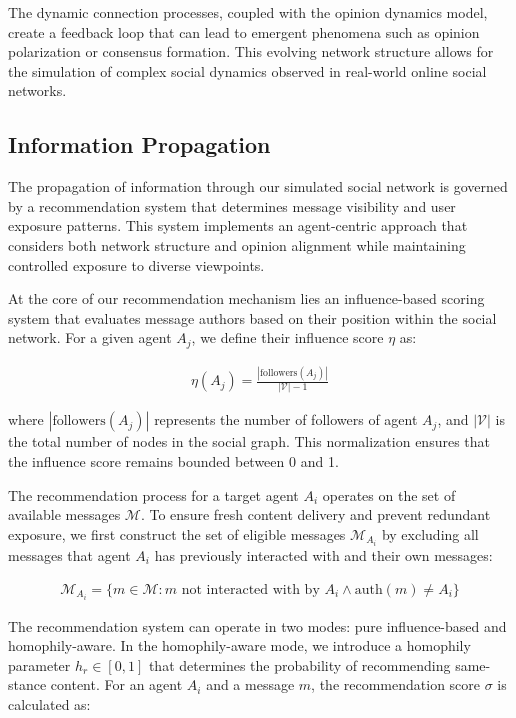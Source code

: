 The dynamic connection processes, coupled with the opinion dynamics model, create a feedback loop that can lead to emergent phenomena such as opinion polarization or consensus formation. This evolving network structure allows for the simulation of complex social dynamics observed in real-world online social networks.

\subsection{Information Propagation}
\label{subsec:information-propagation}

The propagation of information through our simulated social network is governed by a recommendation system that determines message visibility and user exposure patterns. This system implements an agent-centric approach that considers both network structure and opinion alignment while maintaining controlled exposure to diverse viewpoints.

At the core of our recommendation mechanism lies an influence-based scoring system that evaluates message authors based on their position within the social network. For a given agent $A_j$, we define their influence score $\eta$ as:

\begin{align}
\eta(A_j) = \frac{|\text{followers}(A_j)|}{|\mathcal{V}| - 1}
\end{align}

where $|\text{followers}(A_j)|$ represents the number of followers of agent $A_j$, and $|\mathcal{V}|$ is the total number of nodes in the social graph. This normalization ensures that the influence score remains bounded between 0 and 1.

The recommendation process for a target agent $A_i$ operates on the set of available messages $\mathcal{M}$. To ensure fresh content delivery and prevent redundant exposure, we first construct the set of eligible messages $\mathcal{M}_{A_i}$ by excluding all messages that agent $A_i$ has previously interacted with and their own messages:

\begin{align}
\mathcal{M}_{A_i} = \{m \in \mathcal{M} : m \text{ not interacted with by } A_i \land \text{auth}(m) \neq A_i\}
\end{align}

The recommendation system can operate in two modes: pure influence-based and homophily-aware. In the homophily-aware mode, we introduce a homophily parameter $h_r \in [0, 1]$ that determines the probability of recommending same-stance content. For an agent $A_i$ and a message $m$, the recommendation score $\sigma$ is calculated as:

